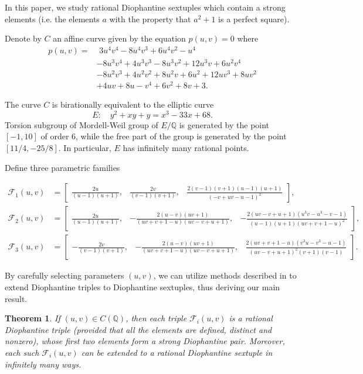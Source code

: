 \documentclass[a4paper]{amsart}
\theoremstyle{plain}
\newtheorem{theorem}{Theorem}
\def\Q{\mathbb{Q}}
\theoremstyle{definition}
\begin{document}
In this paper, we study rational Diophantine sextuples which contain a strong elements (i.e. the elements $a$ with the property that $a^2+1$ is a perfect square).

Denote by $C$ an affine curve given by the equation $p(u,v)=0$ where
\begin{align*}
	p(u, v)  = & \,\, 3u^4v^4 - 8u^4v^3 + 6u^4v^2 - u^4 \\
	& - 8u^3v^4 + 4u^3v^3 - 8u^3v^2 + 12u^3v + 6u^2v^4 \\
	& - 8u^2v^3 + 4u^2v^2 + 8u^2v + 6u^2 + 12uv^3 + 8uv^2 \\
	& + 4uv + 8u - v^4 + 6v^2 + 8v + 3.
\end{align*}

The curve $C$ is birationally equivalent to the elliptic curve $$E:\quad y^2 + xy + y = x^3 - 33x + 68.$$ Torsion subgroup of Mordell-Weil group of $E/\Q$ is generated by the point $[-1,10]$ of order $6$, while the free part of the group is generated by the point $[11/4,-25/8]$. In particular, $E$ has infinitely many rational points.


Define three parametric families

\begin{align*}
	\mathcal{F}_1(u,v) &=\begin{bmatrix}
		\frac{2u}{(u-1)(u+1)}, & \frac{2v}{(v-1)(v+1)}, & \frac{2(v-1)(v+1)(u-1)(u+1)}{(-v+uv-u-1)^2}
	\end{bmatrix}, \\
\mathcal{F}_2(u,v) &=\begin{bmatrix}
		\frac{2u}{(u-1)(u+1)}, & -\frac{2(u-v)(uv+1)}{(uv+v+1-u)(uv-v+u+1)}, & -\frac{2(uv-v+u+1)(u^3v-u^3-v-1)}{(u-1)(u+1)(uv+v+1-u)^2}
	\end{bmatrix}, \\
	\mathcal{F}_3(u,v) &=\begin{bmatrix}
		-\frac{2v}{(v-1)(v+1)}, & -\frac{2(u-v)(uv+1)}{(uv+v+1-u)(uv-v+u+1)}, & \frac{2(uv+v+1-u)(v^3u-v^3-u-1)}{(uv-v+u+1)^2(v+1)(v-1)}
	\end{bmatrix}.
\end{align*}

By carefully selecting parameters $(u,v)$, we can utilize methods described in \cite{DKMS} to extend Diophantine triples to Diophantine sextuples, thus deriving our main result.

\begin{theorem}\label{thm:1} If $(u,v)\in C(\Q)$, then each triple $\mathcal{F}_i(u,v)$ is a rational Diophantine triple (provided that all the elements are defined, distinct and nonzero), whose first two elements form a strong Diophantine pair. Moreover, each such $\mathcal{F}_i(u,v)$ can be extended to a rational Diophantine sextuple in infinitely many ways.
	
\end{theorem}
\end{document}
